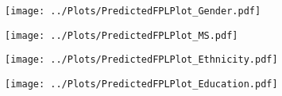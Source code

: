 \begin{figure}[H]
\centering
\caption{Income poverty profiles for households with working age adults with disability (a) by gender (b) by marital status (c) by race and ethnicity (d) by education, of reference person}
\begin{subfigure}{0.49\linewidth}
\texttt{[image: ../Plots/PredictedFPLPlot\_Gender.pdf]}
\caption{}
\label{fig:disab_gender}
\end{subfigure}
\begin{subfigure}{0.49\linewidth}
\texttt{[image: ../Plots/PredictedFPLPlot\_MS.pdf]} 
\caption{}
\label{fig:disab_MS} 
\end{subfigure}
\newline
\begin{subfigure}{0.49\linewidth}
\texttt{[image: ../Plots/PredictedFPLPlot\_Ethnicity.pdf]}
\caption{}
\label{fig:disab_race}
\end{subfigure}
\begin{subfigure}{0.49\linewidth}
\texttt{[image: ../Plots/PredictedFPLPlot\_Education.pdf]}
\caption{}
\label{fig:disab_education}
\end{subfigure}
\label{fig:Disab_Demographics}
\end{figure}



